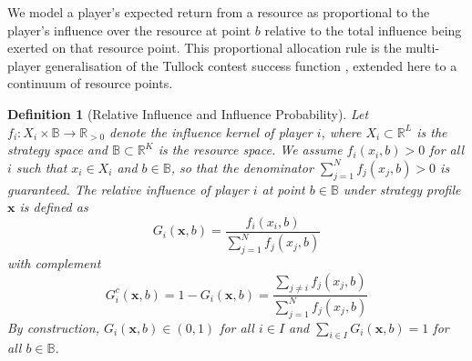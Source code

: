 \documentclass{article}
\newtheorem{definition}{Definition}
\begin{document}
                We model a player's expected return from a resource as proportional to the player's influence over the resource at point $b$ relative to the total influence being exerted on that resource point. This proportional allocation rule is the multi-player generalisation of the Tullock contest success function \cite{tullock1980efficient,skaperdas1996contest,clark1998competition}, extended here to a continuum of resource points.
                \begin{definition}[Relative Influence and Influence Probability]
                    Let $f_i : X_i \times \mathbb{B} \to \mathbb{R}_{>0}$ denote the influence 
                    kernel of player $i$, where $X_i \subset \mathbb{R}^L$ is the strategy space 
                    and $\mathbb{B} \subset \mathbb{R}^K$ is the resource space. We assume 
                    $f_i(x_i, b) > 0$ for all $i$ such that $x_i \in X_i$ and $b \in \mathbb{B}$, so that 
                    the denominator $\sum_{j=1}^{N} f_j(x_j,b) > 0$ is guaranteed. The 
                    relative influence of player $i$ at point $b \in \mathbb{B}$ under 
                    strategy profile $\mathbf{x}$ is defined as
                    \begin{equation}\label{eq:SI_relative_influence}
                        G_i(\mathbf{x},b) = \frac{f_i(x_i,b)}{\sum_{j=1}^{N}f_j(x_j,b)}
                    \end{equation}
                    with complement
                    \begin{equation}\label{eq:SI_relative_influence_comp}
                        G_i^c(\mathbf{x},b) = 1 - G_i(\mathbf{x},b) = 
                        \frac{\sum_{j \neq i} f_j(x_j,b)}{\sum_{j=1}^{N}f_j(x_j,b)}
                    \end{equation}
                    By construction, $G_i(\mathbf{x},b) \in (0,1)$ for all $i \in I$ and 
                    $\sum_{i \in I} G_i(\mathbf{x},b) = 1$ for all $b \in \mathbb{B}$.


\end{definition}
\end{document}
